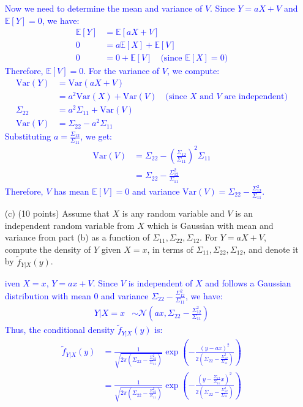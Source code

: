\documentclass{article}
\begin{document}
\begin{enumerate}
    \textcolor{blue}{
        Now we need to determine the mean and variance of $V$.
Since $Y = aX + V$ and $\mathbb{E}[Y] = 0$, we have:
\begin{align}
\mathbb{E}[Y] &= \mathbb{E}[aX + V]\\
0 &= a\mathbb{E}[X] + \mathbb{E}[V]\\
0 &= 0 + \mathbb{E}[V] \quad \text{(since $\mathbb{E}[X] = 0$)}
\end{align}
Therefore, $\mathbb{E}[V] = 0$.
For the variance of $V$, we compute:
\begin{align}
\text{Var}(Y) &= \text{Var}(aX + V)\\
&= a^2\text{Var}(X) + \text{Var}(V) \quad \text{(since $X$ and $V$ are independent)}\\
\Sigma_{22} &= a^2 \Sigma_{11} + \text{Var}(V)\\
\text{Var}(V) &= \Sigma_{22} - a^2\Sigma_{11}
\end{align}
Substituting $a = \frac{\Sigma_{12}}{\Sigma_{11}}$, we get:
\begin{align}
\text{Var}(V) &= \Sigma_{22} - \left(\frac{\Sigma_{12}}{\Sigma_{11}}\right)^2 \Sigma_{11}\\
&= \Sigma_{22} - \frac{\Sigma_{12}^2}{\Sigma_{11}}
\end{align}
Therefore, $V$ has mean $\mathbb{E}[V] = 0$ and variance $\text{Var}(V) = \Sigma_{22} - \frac{\Sigma_{12}^2}{\Sigma_{11}}$.
    }

    
    \item[(c)] (10 points) Assume that $X$ is any random variable and $V$ is an independent random variable from $X$ which is Gaussian with mean and variance from part (b) as a function of $\Sigma_{11}, \Sigma_{22}, \Sigma_{12}$. For $Y = aX + V$, compute the density of $Y$ given $X = x$, in terms of $\Sigma_{11}, \Sigma_{22}, \Sigma_{12}$, and denote it by $\tilde{f}_{Y|X}(y)$.

        \textcolor{blue}{
            iven $X = x$, $Y = ax + V$. Since $V$ is independent of $X$ and follows a Gaussian distribution with mean 0 and variance $\Sigma_{22} - \frac{\Sigma_{12}^2}{\Sigma_{11}}$, we have:
\begin{align}
Y|X=x &\sim \mathcal{N}\left(ax, \Sigma_{22} - \frac{\Sigma_{12}^2}{\Sigma_{11}}\right)
\end{align}
Thus, the conditional density $\tilde{f}_{Y|X}(y)$ is:
\begin{align}
\tilde{f}_{Y|X}(y) &= \frac{1}{\sqrt{2\pi\left(\Sigma_{22} - \frac{\Sigma_{12}^2}{\Sigma_{11}}\right)}} \exp\left(-\frac{(y-ax)^2}{2\left(\Sigma_{22} - \frac{\Sigma_{12}^2}{\Sigma_{11}}\right)}\right)\\
&= \frac{1}{\sqrt{2\pi\left(\Sigma_{22} - \frac{\Sigma_{12}^2}{\Sigma_{11}}\right)}} \exp\left(-\frac{(y-\frac{\Sigma_{12}}{\Sigma_{11}}x)^2}{2\left(\Sigma_{22} - \frac{\Sigma_{12}^2}{\Sigma_{11}}\right)}\right)
\end{align}
        }
    

\end{enumerate}
\end{document}

